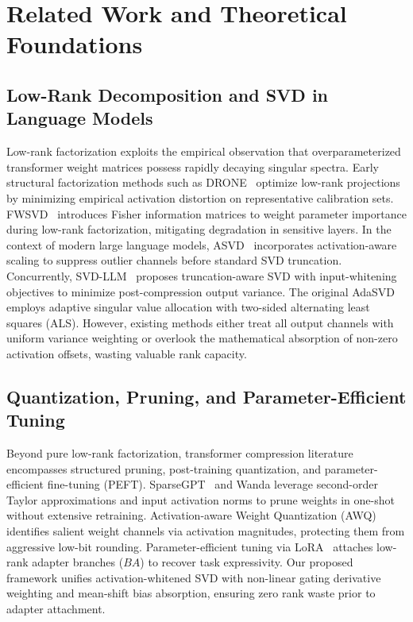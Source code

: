 \documentclass{article}
\begin{document}
\section{Related Work and Theoretical Foundations}

\subsection{Low-Rank Decomposition and SVD in Language Models}
Low-rank factorization exploits the empirical observation that overparameterized transformer weight matrices possess rapidly decaying singular spectra. Early structural factorization methods such as DRONE~\cite{chen2021drone} optimize low-rank projections by minimizing empirical activation distortion on representative calibration sets. FWSVD~\cite{hsu2022fwsvd} introduces Fisher information matrices to weight parameter importance during low-rank factorization, mitigating degradation in sensitive layers. In the context of modern large language models, ASVD~\cite{yuan2023asvd} incorporates activation-aware scaling to suppress outlier channels before standard SVD truncation. Concurrently, SVD-LLM~\cite{wang2025svdllm} proposes truncation-aware SVD with input-whitening objectives to minimize post-compression output variance. The original AdaSVD~\cite{li2025adasvd} employs adaptive singular value allocation with two-sided alternating least squares (ALS). However, existing methods either treat all output channels with uniform variance weighting or overlook the mathematical absorption of non-zero activation offsets, wasting valuable rank capacity.

\subsection{Quantization, Pruning, and Parameter-Efficient Tuning}
Beyond pure low-rank factorization, transformer compression literature encompasses structured pruning, post-training quantization, and parameter-efficient fine-tuning (PEFT). SparseGPT~\cite{frantar2023} and Wanda leverage second-order Taylor approximations and input activation norms to prune weights in one-shot without extensive retraining. Activation-aware Weight Quantization (AWQ)~\cite{lin2024awq} identifies salient weight channels via activation magnitudes, protecting them from aggressive low-bit rounding. Parameter-efficient tuning via LoRA~\cite{hu2021lora} attaches low-rank adapter branches ($B A$) to recover task expressivity. Our proposed framework unifies activation-whitened SVD with non-linear gating derivative weighting and mean-shift bias absorption, ensuring zero rank waste prior to adapter attachment.
\end{document}
